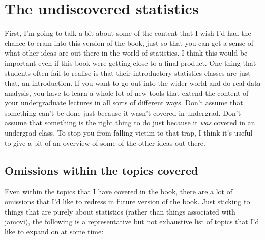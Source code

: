 \documentclass[
]{book}
\begin{document}
\hypertarget{the-undiscovered-statistics}{%
\section{The undiscovered statistics}\label{the-undiscovered-statistics}}

First, I'm going to talk a bit about some of the content that I wish I'd had the chance to cram into this version of the book, just so that you can get a sense of what other ideas are out there in the world of statistics. I think this would be important even if this book were getting close to a final product. One thing that students often fail to realise is that their introductory statistics classes are just that, an introduction. If you want to go out into the wider world and do real data analysis, you have to learn a whole lot of new tools that extend the content of your undergraduate lectures in all sorts of different ways. Don't assume that something can't be done just because it wasn't covered in undergrad. Don't assume that something is the right thing to do just because it \emph{was} covered in an undergrad class. To stop you from falling victim to that trap, I think it's useful to give a bit of an overview of some of the other ideas out there.

\hypertarget{omissions-within-the-topics-covered}{%
\subsection{Omissions within the topics covered}\label{omissions-within-the-topics-covered}}

Even within the topics that I have covered in the book, there are a lot of omissions that I'd like to redress in future version of the book. Just sticking to things that are purely about statistics (rather than things associated with jamovi), the following is a representative but not exhaustive list of topics that I'd like to expand on at some time:
\end{document}
